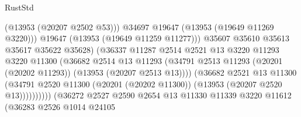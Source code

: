 \begin{lexlean}{RustStd}
\begin{coremodule}
                                                (@13953 (@20207 @2502 @53)))
                                              @34697
                                              @19647
                                              (@13953 (@19649 @11269 @3220)))
                                            @19647
                                            (@13953 (@19649 @11259 @11277)))
                                          @35607
                                          @35610
                                          @35613
                                          @35617
                                          @35622
                                          @35628)
                                        (@36337
                                          @11287
                                          @2514
                                          @2521
                                          @13
                                          @3220
                                          @11293
                                          @3220
                                          @11300
                                          (@36682
                                            @2514
                                            @13
                                            @11293
                                            (@34791
                                              @2513
                                              @11293
                                              (@20201 (@20202 @11293))
                                              (@13953 (@20207 @2513 @13))))
                                          (@36682
                                            @2521
                                            @13
                                            @11300
                                            (@34791
                                              @2520
                                              @11300
                                              (@20201 (@20202 @11300))
                                              (@13953 (@20207 @2520 @13))))))))))
                              (@36272
                                @2527
                                @2590
                                @2654
                                @13
                                @11330
                                @11339
                                @3220
                                @11612
                                (@36283
                                  @2526
                                  @1014
                                  @24105

\end{coremodule}
\end{lexlean}
